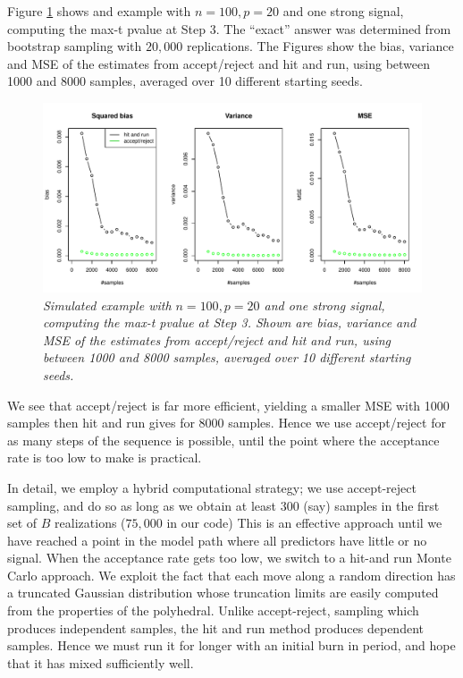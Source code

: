 \documentclass{article}
\begin{document}
Figure \ref{fig:comparison} shows and example with $n=100,p=20$ and one strong signal, computing the max-t pvalue at Step 3.
The ``exact'' answer  was determined from bootstrap sampling with $20,000$ replications.
The Figures show the bias, variance and MSE of the estimates from accept/reject and hit and run, using between 1000 and 8000 samples, averaged
over 10 different starting seeds.
\begin{figure}[htp]
\centering
  \includegraphics[width=\textwidth]{figs/comparison.pdf}
  \caption{\em Simulated example with $n= 100, p=20$ and one strong signal, computing the max-t pvalue at Step 3.  Shown are bias, variance and MSE of the estimates from accept/reject and hit and run, using between 1000 and 8000 samples, averaged
over 10 different starting seeds.
}
  \label{fig:comparison}
\end{figure}
We see that accept/reject is far more efficient, yielding a smaller MSE with 1000 samples then hit and run gives for  8000 samples.
Hence we use accept/reject for as many steps of the sequence is possible,  until the point where the acceptance rate is too low to make is practical.

In detail, we employ a hybrid computational strategy; we use accept-reject sampling, and do so as long as we obtain at least 300 (say) samples in the first set
of $B$ realizations ($75,000$ in our code)  This is an effective approach until we have reached a point in the model path where all predictors have little or no signal.
When the acceptance rate gets too low, we switch to a hit-and run Monte Carlo approach. We exploit the fact that each move along a random direction 
has a truncated Gaussian distribution whose truncation limits are easily computed from the properties of the polyhedral. Unlike accept-reject, sampling
which produces independent samples,  the hit and run method produces dependent samples. Hence we must run it for longer with an initial burn in period,
and hope that it has mixed sufficiently well.
\end{document}
